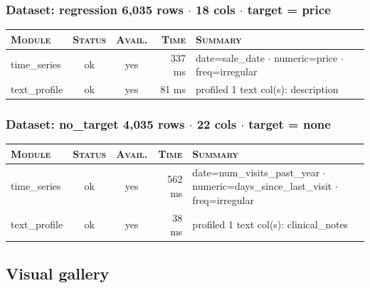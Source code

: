 \documentclass[11pt,a4paper]{article}
\begin{document}
\subsubsection*{Dataset: regression
\hfill {\color{ink3}\footnotesize 6,035 rows
{$\boldsymbol{\cdot}$} 18 cols
{$\boldsymbol{\cdot}$} target = price}}

\begin{tabularx}{\linewidth}{l c c r X}
\toprule
\textsc{Module} & \textsc{Status} & \textsc{Avail.} & \textsc{Time} & \textsc{Summary} \\
\midrule
time\_series & \textcolor{ok}{ok} & \textcolor{ok}{yes} & 337 ms & date=sale\_date $\cdot$ numeric=price $\cdot$ freq=irregular \\
text\_profile & \textcolor{ok}{ok} & \textcolor{ok}{yes} & 81 ms & profiled 1 text col(s): description \\
\bottomrule
\end{tabularx}


\subsubsection*{Dataset: no\_target
\hfill {\color{ink3}\footnotesize 4,035 rows
{$\boldsymbol{\cdot}$} 22 cols
{$\boldsymbol{\cdot}$} target = none}}

\begin{tabularx}{\linewidth}{l c c r X}
\toprule
\textsc{Module} & \textsc{Status} & \textsc{Avail.} & \textsc{Time} & \textsc{Summary} \\
\midrule
time\_series & \textcolor{ok}{ok} & \textcolor{ok}{yes} & 562 ms & date=num\_visits\_past\_year $\cdot$ numeric=days\_since\_last\_visit $\cdot$ freq=irregular \\
text\_profile & \textcolor{ok}{ok} & \textcolor{ok}{yes} & 38 ms & profiled 1 text col(s): clinical\_notes \\
\bottomrule
\end{tabularx}


\subsection{Visual gallery}
\end{document}
